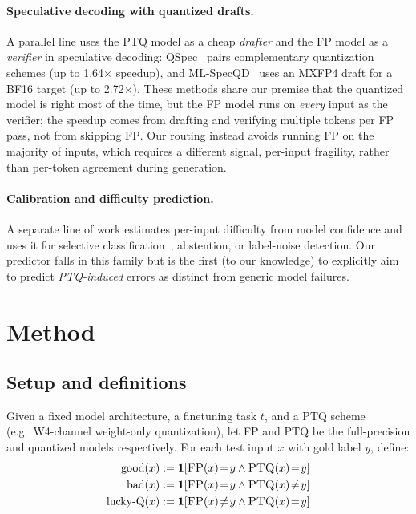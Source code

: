 \documentclass{article}
\newcommand{\fp}{\textsc{FP}\xspace}
\newcommand{\ptq}{\textsc{PTQ}\xspace}
\begin{document}
\paragraph{Speculative decoding with quantized drafts.}
A parallel line uses the \ptq{} model as a cheap \emph{drafter} and the \fp{} model as a \emph{verifier} in speculative decoding: QSpec~\cite{zhao2025qspec} pairs complementary quantization schemes (up to 1.64$\times$ speedup), and ML-SpecQD~\cite{georganas2025mlspecqdmultilevelspeculativedecoding} uses an MXFP4 draft for a BF16 target (up to 2.72$\times$). These methods share our premise that the quantized model is right most of the time, but the \fp{} model runs on \emph{every} input as the verifier; the speedup comes from drafting and verifying multiple tokens per \fp{} pass, not from skipping \fp{}. Our routing instead avoids running \fp{} on the majority of inputs, which requires a different signal, per-input fragility, rather than per-token agreement during generation.

\paragraph{Calibration and difficulty prediction.}
A separate line of work estimates per-input difficulty from model confidence and uses it for selective classification~\cite{geifman2017selective}, abstention, or label-noise detection.
Our predictor falls in this family but is the first (to our knowledge) to explicitly aim to predict \emph{\ptq-induced} errors as distinct from generic model failures.

\section{Method}\label{sec:method}

\subsection{Setup and definitions}

Given a fixed model architecture, a finetuning task \(t\), and a \ptq scheme (e.g.\ W4-channel weight-only quantization), let \fp and \ptq be the full-precision and quantized models respectively.
For each test input \(x\) with gold label \(y\), define:
\begin{align}
  \text{good}(x) &:= \mathbf{1}\!\left[\fp(x)\!=\!y \wedge \ptq(x)\!=\!y\right]\\
  \text{bad}(x)  &:= \mathbf{1}\!\left[\fp(x)\!=\!y \wedge \ptq(x)\!\neq\!y\right]\\
  \text{lucky-Q}(x) &:= \mathbf{1}\!\left[\fp(x)\!\neq\!y \wedge \ptq(x)\!=\!y\right]
\end{align}
\end{document}
